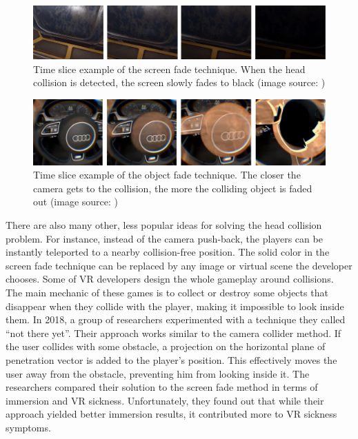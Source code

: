 \begin{figure}[th]
\centering
\includegraphics[width=1\textwidth]{img/screen_fade.png}
\caption{Time slice example of the screen fade technique. When the head collision is detected, the screen slowly fades to black (image source: \cite{SCREENFADE})}
\label{fig:SCREENFADEIMAGE}
\end{figure}

\begin{figure}[th]
\centering
\includegraphics[width=1\textwidth]{img/object_fade.png}
\caption{Time slice example of the object fade technique. The closer the camera gets to the collision, the more the colliding object is faded out (image source: \cite{OBJECTFADE})}
\label{fig:OBJECTFADEIMAGE}
\end{figure}

There are also many other, less popular ideas for solving the head collision problem. For instance, instead of the camera push-back, the players can be instantly teleported to a nearby collision-free position. The solid color in the screen fade technique can be replaced by any image or virtual scene the developer chooses. Some of VR developers design the whole gameplay around collisions. The main mechanic of these games is to collect or destroy some objects that disappear when they collide with the player, making it impossible to look inside them. In 2018, a group of researchers \cite{COMPARISONCOLLISION} experimented with a technique they called ``not there yet''. Their approach works similar to the camera collider method. If the user collides with some obstacle, a projection on the horizontal plane of penetration vector is added to the player's position. This effectively moves the user away from the obstacle, preventing him from looking inside it. The researchers compared their solution to the screen fade method in terms of immersion and VR sickness. Unfortunately, they found out that while their approach yielded better immersion results, it contributed more to VR sickness symptoms.

